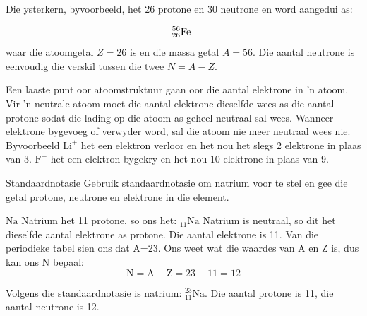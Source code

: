 Die ysterkern, byvoorbeeld, het 26 protone en 30 neutrone en word aangedui as:\par 
\begin{equation*}
_{26}^{56}\text{Fe}\phantom{\rule{4pt}{0ex}}
\end{equation*}
waar die atoomgetal $Z = 26$ is en die massa getal $A = 56$. Die aantal neutrone is
eenvoudig die verskil tussen die twee $N = A - Z$. \par 


Een laaste punt oor atoomstruktuur gaan oor die aantal elektrone in  'n atoom. Vir   'n neutrale atoom moet die aantal elektrone dieselfde wees as die aantal protone sodat die lading op die atoom as geheel neutraal sal wees. Wanneer elektrone bygevoeg of verwyder word, sal die atoom nie meer neutraal wees nie. Byvoorbeeld $\text{Li}^{+}$ het een elektron verloor en het nou het slegs 2 elektrone in plaas van 3. $\text{F}^{-}$ het een elektron bygekry en het nou 10 elektrone in plaas van 9.   
\begin{wex}
{%
Standaardnotasie
}
{%
Gebruik standaardnotasie om natrium voor te stel en gee die getal protone, neutrone en elektrone in die element.
}
{%
 $\text{Na}$
 Natrium het 11 protone, so ons het: ${}_{11}\text{Na}$
 Natrium is neutraal, so dit het dieselfde aantal elektrone as protone. Die aantal elektrone is 11.
 Van die periodieke tabel sien ons dat A=23.
Ons weet wat die waardes van A en Z is, dus kan  ons N bepaal:
$$ \text{N} = \text{A} - \text{Z} = 23 - 11 = 12 $$

 Volgens die standaardnotasie is natrium: $_{11}^{23}\text{Na}$. Die aantal protone is 11, die aantal neutrone is 12. 
}    
\end{wex}
    

